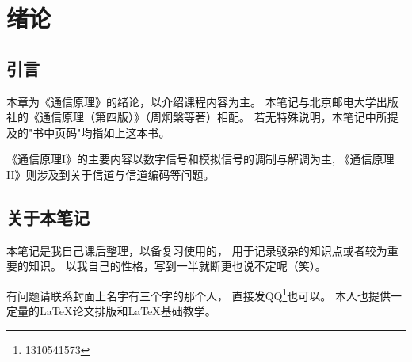 \section{绪论}
\subsection{引言}
    本章为《通信原理》的绪论，以介绍课程内容为主。
    本笔记与北京邮电大学出版社的《通信原理（第四版）》（周炯槃等著）相配。
    若无特殊说明，本笔记中所提及的"书中页码"均指如上这本书。

    《通信原理I》的主要内容以数字信号和模拟信号的调制与解调为主,
    《通信原理II》则涉及到关于信道与信道编码等问题。

\subsection{关于本笔记}
    本笔记是我自己课后整理，以备复习使用的，
    用于记录驳杂的知识点或者较为重要的知识。
    以我自己的性格，写到一半就断更也说不定呢（笑）。

    有问题请联系封面上名字有三个字的那个人，
    直接发QQ\footnote{1310541573}也可以。
    本人也提供一定量的\textcolor{bupt}{\LaTeX{}}论文排版和\textcolor{bupt}{\LaTeX{}}基础教学。

    